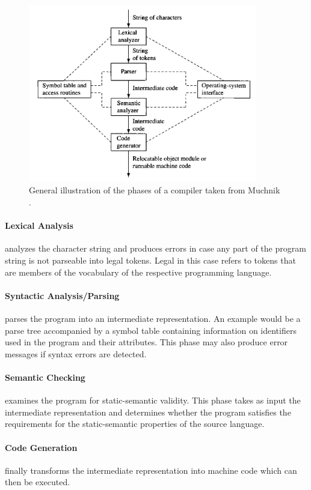 \documentclass[runningheads]{llncs}
\begin{document}
\begin{figure}[H]

\centering
\includegraphics[width=10cm]{compiler.png}
\caption{General illustration of the phases of a compiler taken from Muchnik \cite{muchnick1997advanced}.}
\label{fig:compiler}
\end{figure}

\paragraph{Lexical Analysis} analyzes the character string and produces errors in case any part of the program string is not parseable into legal tokens. Legal in this case refers to tokens that are members of the vocabulary of the respective programming language.

\paragraph{Syntactic Analysis/Parsing} parses the program into an intermediate representation. An example would be a parse tree accompanied by a symbol table containing information on identifiers used in the program and their attributes. This phase may also produce error messages if syntax errors are detected.

\paragraph{Semantic Checking} examines the program for static-semantic validity. This phase takes as input the intermediate representation and determines whether the program satisfies the requirements for the static-semantic properties of the source language.

\paragraph{Code Generation} finally transforms the intermediate representation into machine code which can then be executed. 
\end{document}
